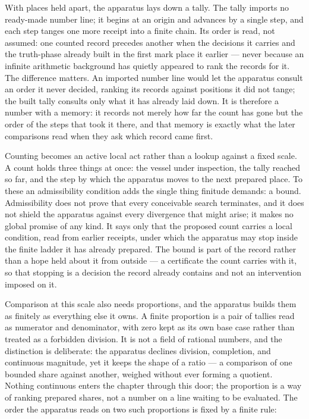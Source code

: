 With places held apart, the apparatus lays down a tally. The tally imports no ready-made number line; it begins at an origin and advances by a single step, and each step tanges one more receipt into a finite chain. Its order is read, not assumed: one counted record precedes another when the decisions it carries and the truth-phase already built in the first mark place it earlier --- never because an infinite arithmetic background has quietly appeared to rank the records for it. The difference matters. An imported number line would let the apparatus consult an order it never decided, ranking its records against positions it did not tange; the built tally consults only what it has already laid down. It is therefore a number with a memory: it records not merely how far the count has gone but the order of the steps that took it there, and that memory is exactly what the later comparisons read when they ask which record came first.

Counting becomes an active local act rather than a lookup against a fixed scale. A count holds three things at once: the vessel under inspection, the tally reached so far, and the step by which the apparatus moves to the next prepared place. To these an admissibility condition adds the single thing finitude demands: a bound. Admissibility does not prove that every conceivable search terminates, and it does not shield the apparatus against every divergence that might arise; it makes no global promise of any kind. It says only that the proposed count carries a local condition, read from earlier receipts, under which the apparatus may stop inside the finite ladder it has already prepared. The bound is part of the record rather than a hope held about it from outside --- a certificate the count carries with it, so that stopping is a decision the record already contains and not an intervention imposed on it.

Comparison at this scale also needs proportions, and the apparatus builds them as finitely as everything else it owns. A finite proportion is a pair of tallies read as numerator and denominator, with zero kept as its own base case rather than treated as a forbidden division. It is not a field of rational numbers, and the distinction is deliberate: the apparatus declines division, completion, and continuous magnitude, yet it keeps the shape of a ratio --- a comparison of one bounded share against another, weighed without ever forming a quotient. Nothing continuous enters the chapter through this door; the proportion is a way of ranking prepared shares, not a number on a line waiting to be evaluated. The order the apparatus reads on two such proportions is fixed by a finite rule:

